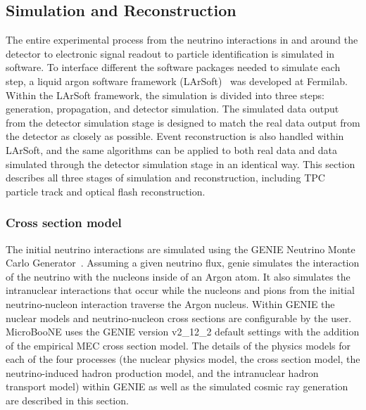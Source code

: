 \subsection{Simulation and Reconstruction}\label{sec:simreco}
  The entire experimental process from the neutrino interactions in and around
  the detector to electronic signal readout to particle identification is
  simulated in software. To interface different the software packages needed to
  simulate each step, a liquid argon software framework (LArSoft)~\cite{larsoft}
  was developed at Fermilab. Within the LArSoft framework, the simulation is
  divided into three steps: generation, propagation, and detector simulation.
  The simulated data output from the detector simulation stage is designed to
  match the real data output from the detector as closely as possible. Event
  reconstruction is also handled within LArSoft, and the same algorithms can be
  applied to both real data and data simulated through the detector simulation
  stage in an identical way. This section describes all three stages of
  simulation and reconstruction, including TPC particle track and optical flash
  reconstruction.

  \subsubsection{Cross section model}
    The initial neutrino interactions are simulated using the GENIE Neutrino
    Monte Carlo Generator~\cite{Andreopoulos:2009rq,Andreopoulos:2015wxa}.
    Assuming a given neutrino flux, genie simulates the interaction of the
    neutrino with the nucleons inside of an Argon atom. It also simulates the
    intranuclear interactions that occur while the nucleons and pions from the
    initial neutrino-nucleon interaction traverse the Argon nucleus.  Within
    GENIE the nuclear models and neutrino-nucleon cross sections are
    configurable by the user.  MicroBooNE uses the GENIE version v2\_12\_2
    default settings with the addition of the empirical MEC cross section
    model. The details of the physics models for each of the four processes
    (the nuclear physics model, the cross section model, the neutrino-induced
    hadron production model, and the intranuclear hadron transport model)
    within GENIE as well as the simulated cosmic ray generation are described
    in this section.

